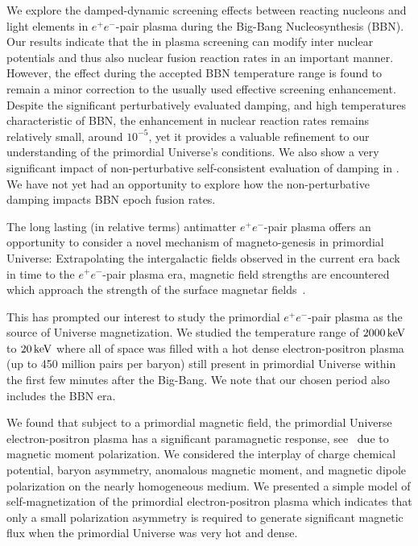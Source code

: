 We explore the damped-dynamic screening effects between reacting nucleons and light elements in $e^+e^-$-pair plasma during the Big-Bang Nucleosynthesis (BBN). Our results indicate that the in plasma screening can modify inter nuclear potentials and thus also nuclear fusion reaction rates in an important manner. However, the effect during the accepted BBN temperature range is found to remain a minor correction to the usually used effective screening enhancement. Despite the significant perturbatively evaluated damping, and high temperatures characteristic of BBN, the enhancement in nuclear reaction rates remains relatively small, around $10^{-5}$, yet it provides a valuable refinement to our understanding of the primordial Universe's conditions. We also show a very significant impact of non-perturbative self-consistent evaluation of damping in . We have not yet had an opportunity to explore how the non-perturbative damping impacts BBN epoch fusion rates. 

The long lasting (in relative terms) antimatter $e^+e^-$-pair plasma offers an opportunity to consider a novel mechanism of magneto-genesis in primordial Universe: Extrapolating the intergalactic fields observed in the current era back in time to the $e^+e^-$-pair plasma era, magnetic field strengths are encountered which approach the strength of the surface magnetar fields~.

This has prompted our interest to study the primordial $e^+e^-$-pair plasma as the source of Universe magnetization. We studied the temperature range of $2000\text{\,keV}$ to $20\text{\,keV}$ where all of space was filled with a hot dense electron-positron plasma (up to 450 million pairs per baryon) still present in primordial Universe within the first few minutes after the Big-Bang. We note that our chosen period also includes the BBN era.

We found that subject to a primordial magnetic field, the primordial Universe electron-positron plasma has a significant paramagnetic response, see~ due to magnetic moment polarization. We considered the interplay of charge chemical potential, baryon asymmetry, anomalous magnetic moment, and magnetic dipole polarization on the nearly homogeneous medium. We presented a simple model of self-magnetization of the primordial electron-positron plasma which indicates that only a small polarization asymmetry is required to generate significant magnetic flux when the primordial Universe was very hot and dense.

